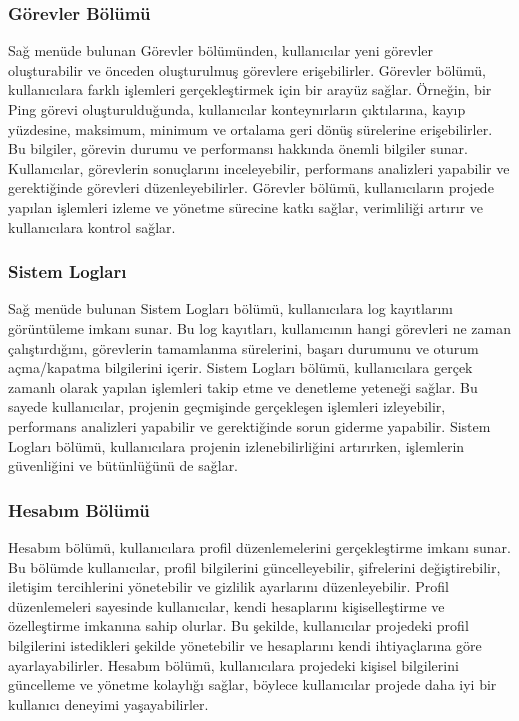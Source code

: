 \subsubsection{Görevler Bölümü}
Sağ menüde bulunan Görevler bölümünden, kullanıcılar yeni görevler oluşturabilir ve önceden oluşturulmuş görevlere erişebilirler. Görevler bölümü, kullanıcılara farklı işlemleri gerçekleştirmek için bir arayüz sağlar. Örneğin, bir Ping görevi oluşturulduğunda, kullanıcılar konteynırların çıktılarına, kayıp yüzdesine, maksimum, minimum ve ortalama geri dönüş sürelerine erişebilirler. Bu bilgiler, görevin durumu ve performansı hakkında önemli bilgiler sunar. Kullanıcılar, görevlerin sonuçlarını inceleyebilir, performans analizleri yapabilir ve gerektiğinde görevleri düzenleyebilirler. Görevler bölümü, kullanıcıların projede yapılan işlemleri izleme ve yönetme sürecine katkı sağlar, verimliliği artırır ve kullanıcılara kontrol sağlar.
\subsubsection{Sistem Logları}
Sağ menüde bulunan Sistem Logları bölümü, kullanıcılara log kayıtlarını görüntüleme imkanı sunar. Bu log kayıtları, kullanıcının hangi görevleri ne zaman çalıştırdığını, görevlerin tamamlanma sürelerini, başarı durumunu ve oturum açma/kapatma bilgilerini içerir. Sistem Logları bölümü, kullanıcılara gerçek zamanlı olarak yapılan işlemleri takip etme ve denetleme yeteneği sağlar. Bu sayede kullanıcılar, projenin geçmişinde gerçekleşen işlemleri izleyebilir, performans analizleri yapabilir ve gerektiğinde sorun giderme yapabilir. Sistem Logları bölümü, kullanıcılara projenin izlenebilirliğini artırırken, işlemlerin güvenliğini ve bütünlüğünü de sağlar.
\subsubsection{Hesabım Bölümü}
Hesabım bölümü, kullanıcılara profil düzenlemelerini gerçekleştirme imkanı sunar. Bu bölümde kullanıcılar, profil bilgilerini güncelleyebilir, şifrelerini değiştirebilir, iletişim tercihlerini yönetebilir ve gizlilik ayarlarını düzenleyebilir. Profil düzenlemeleri sayesinde kullanıcılar, kendi hesaplarını kişiselleştirme ve özelleştirme imkanına sahip olurlar. Bu şekilde, kullanıcılar projedeki profil bilgilerini istedikleri şekilde yönetebilir ve hesaplarını kendi ihtiyaçlarına göre ayarlayabilirler. Hesabım bölümü, kullanıcılara projedeki kişisel bilgilerini güncelleme ve yönetme kolaylığı sağlar, böylece kullanıcılar projede daha iyi bir kullanıcı deneyimi yaşayabilirler.

